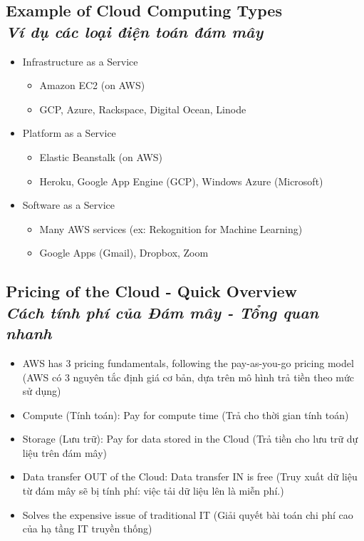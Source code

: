 \subsection[Example of Cloud Computing Types]{Example of Cloud Computing Types \\
	\textit{Ví dụ các loại điện toán đám mây}}
	\begin{itemize}
		\item Infrastructure as a Service
		\begin{itemize}
			\item Amazon EC2 (on AWS)
			\item GCP, Azure, Rackspace, Digital Ocean, Linode
		\end{itemize}
		\item Platform as a Service
		\begin{itemize}
			\item Elastic Beanstalk (on AWS)
			\item Heroku, Google App Engine (GCP), Windows Azure (Microsoft)
		\end{itemize}
		\item Software as a Service
		\begin{itemize}
			\item Many AWS services (ex: Rekognition for Machine Learning)
			\item Google Apps (Gmail), Dropbox, Zoom
		\end{itemize}
	\end{itemize}

\subsection[Pricing of the Cloud - Quick Overview]{Pricing of the Cloud - Quick Overview\\
	\textit{Cách tính phí của Đám mây - Tổng quan nhanh}}

\begin{itemize}
	\item AWS has 3 pricing fundamentals, following the pay-as-you-go pricing model (AWS có 3 nguyên tắc định giá cơ bản, dựa trên mô hình trả tiền theo mức sử dụng)
	\item Compute (Tính toán): Pay for compute time (Trả cho thời gian tính toán)
	\item Storage (Lưu trữ): Pay for data stored in the Cloud (Trả tiền cho lưu trữ dự liệu trên đám mây)
	\item Data transfer OUT of the Cloud: Data transfer IN is free (Truy xuất dữ liệu từ đám mây sẽ bị tính phí: việc tải dữ liệu lên là miễn phí.) 
	\item Solves the expensive issue of traditional IT (Giải quyết bài toán chi phí cao của hạ tầng IT truyền thống)
\end{itemize}

